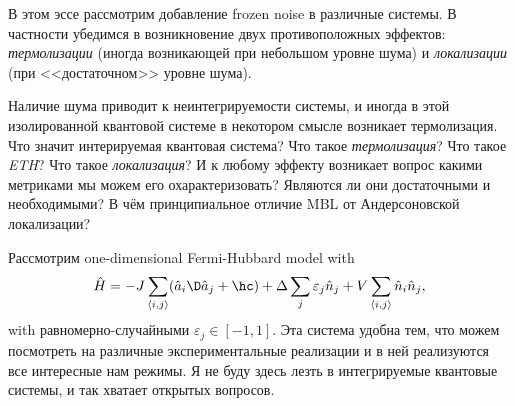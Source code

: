 В этом эссе рассмотрим добавление frozen noise в различные системы.
В частности убедимся в возникновение двух противоположных эффектов: \textit{термолизации} (иногда возникающей при небольшом уровне шума) и \textit{локализации} (при <<достаточном>> уровне шума). 



Наличие шума приводит к неинтегрируемости системы, и иногда в этой изолированной квантовой системе в некотором смысле возникает термолизация. 
Что значит интерируемая квантовая система? Что такое \textit{термолизация}? Что такое \textit{ETH}?
Что такое \textit{локализация}? 
И к любому эффекту возникает вопрос какими метриками мы можем его охарактеризовать? Являются ли они достаточными и необходимыми? В чём принципиальное отличие MBL от Андерсоновской локализации?


	
Рассмотрим one-dimensional Fermi-Hubbard model with 
\begin{equation*}
	\hat{H} = 
	- J \sum_{\langle i,j\rangle} (\hat{a}_i\D \hat{a}_j + \hc) 
	+ \Delta \sum_j \varepsilon_j \hat{n}_j
	+ V \sum_{\langle i,j\rangle} \hat{n}_i \hat{n}_j,
\end{equation*}
with равномерно-случайными $\varepsilon_j \in [-1,1]$. Эта система удобна тем, что можем посмотреть на различные экспериментальные реализации и в ней реализуются все интересные нам режимы. Я не буду здесь лезть в интегрируемые квантовые системы, и так хватает открытых вопросов. 









